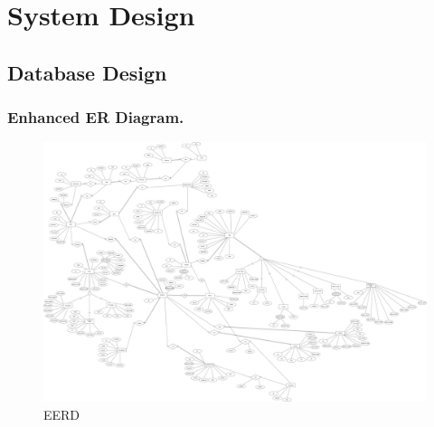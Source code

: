 \chapter{System Design}
\newpage
\section{Database Design}
\subsection{Enhanced ER Diagram.}
\begin{figure}[H]
    \centering
    \includegraphics[height=0.85\textheight]{graphics/DB/freight-flex-ERD.drawio.png}
    \caption{EERD}
    \label{fig:EERD}
\end{figure}
